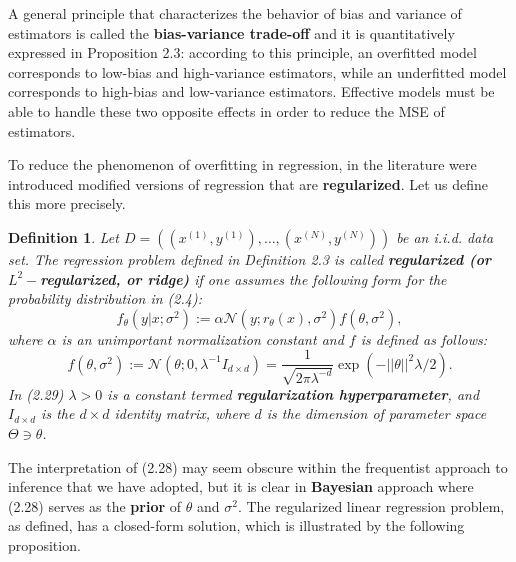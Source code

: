 \documentclass{report}
\newtheorem{definition}{Definition}[chapter]
\begin{document}
A general principle that characterizes the behavior of bias and variance of estimators is called the \textbf{bias-variance trade-off} and it is quantitatively expressed in Proposition 2.3: according to this principle, an overfitted model corresponds to low-bias and high-variance estimators, while an underfitted model corresponds to high-bias and low-variance estimators. Effective models must be able to handle these two opposite effects in order to reduce the MSE of estimators.

To reduce the phenomenon of overfitting in regression, in the literature were introduced modified versions of regression that are \textbf{regularized}. Let us define this more precisely.

\begin{definition}
Let $D = ((x^{(1)},y^{(1)}),\dots,(x^{(N)},y^{(N)}))$ be an i.i.d. data set. The regression problem defined in Definition 2.3 is called \textbf{regularized (or $L^2-$regularized, or ridge)} if one assumes the following form for the probability distribution in (2.4):
\begin{equation}
f_\theta(y|x;\sigma^2) := \alpha\mathcal{N}(y;r_\theta(x),\sigma^2)f(\theta, \sigma^2),
\end{equation}
where $\alpha$ is an unimportant normalization constant and $f$ is defined as follows:
\begin{equation}
f(\theta,\sigma^2) := \mathcal{N}(\theta;0,\lambda^{-1}I_{d\times d}) = \frac{1}{\sqrt{2\pi\lambda^{-d}}}\exp(-||\theta||^2\lambda / 2).
\end{equation}
In (2.29) $\lambda > 0$ is a constant termed \textbf{regularization hyperparameter}, and $I_{d\times d}$ is the $d\times d$ identity matrix, where $d$ is the  dimension of parameter space $\Theta \ni \theta$.
\end{definition}

The interpretation of (2.28) may seem obscure within the frequentist approach to inference that we have adopted, but it is clear in \textbf{Bayesian} approach where (2.28) serves as the \textbf{prior} of $\theta$ and $\sigma^2$. The regularized linear regression problem, as defined, has a closed-form solution, which is illustrated by the following proposition.
\end{document}
